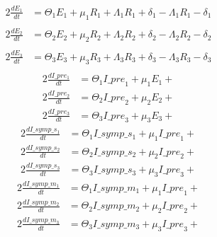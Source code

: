 \documentclass{article}%
\begin{document}
%
\begin{alignat*}{2}%
\frac{dE_{1}}{dt} &= \Theta_{1}E_{1} +  \mu_{1}R_{1} +  \Lambda_{1}R_{1} +  \delta_{1} -  \Lambda_{1}R_{1} -  \delta_{1} \\ &%
\end{alignat*}%
\begin{alignat*}{2}%
\frac{dE_{2}}{dt} &= \Theta_{2}E_{2} +  \mu_{2}R_{2} +  \Lambda_{2}R_{2} +  \delta_{2} -  \Lambda_{2}R_{2} -  \delta_{2} \\ &%
\end{alignat*}%
\begin{alignat*}{2}%
\frac{dE_{3}}{dt} &= \Theta_{3}E_{3} +  \mu_{3}R_{3} +  \Lambda_{3}R_{3} +  \delta_{3} -  \Lambda_{3}R_{3} -  \delta_{3} \\ &%
\end{alignat*}%
\begin{alignat*}{2}%
\frac{dI\_pre_{1}}{dt} &= \Theta_{1}I\_{pre}_{1} +  \mu_{1}E_{1} +%
\end{alignat*}%
\begin{alignat*}{2}%
\frac{dI\_pre_{2}}{dt} &= \Theta_{2}I\_{pre}_{2} +  \mu_{2}E_{2} +%
\end{alignat*}%
\begin{alignat*}{2}%
\frac{dI\_pre_{3}}{dt} &= \Theta_{3}I\_{pre}_{3} +  \mu_{3}E_{3} +%
\end{alignat*}%
\begin{alignat*}{2}%
\frac{dI\_symp\_s_{1}}{dt} &= \Theta_{1}I\_{symp}\_{s}_{1} +  \mu_{1}I\_{pre}_{1} +%
\end{alignat*}%
\begin{alignat*}{2}%
\frac{dI\_symp\_s_{2}}{dt} &= \Theta_{2}I\_{symp}\_{s}_{2} +  \mu_{2}I\_{pre}_{2} +%
\end{alignat*}%
\begin{alignat*}{2}%
\frac{dI\_symp\_s_{3}}{dt} &= \Theta_{3}I\_{symp}\_{s}_{3} +  \mu_{3}I\_{pre}_{3} +%
\end{alignat*}%
\begin{alignat*}{2}%
\frac{dI\_symp\_m_{1}}{dt} &= \Theta_{1}I\_{symp}\_{m}_{1} +  \mu_{1}I\_{pre}_{1} +%
\end{alignat*}%
\begin{alignat*}{2}%
\frac{dI\_symp\_m_{2}}{dt} &= \Theta_{2}I\_{symp}\_{m}_{2} +  \mu_{2}I\_{pre}_{2} +%
\end{alignat*}%
\begin{alignat*}{2}%
\frac{dI\_symp\_m_{3}}{dt} &= \Theta_{3}I\_{symp}\_{m}_{3} +  \mu_{3}I\_{pre}_{3} +%
\end{alignat*}%
\end{document}

